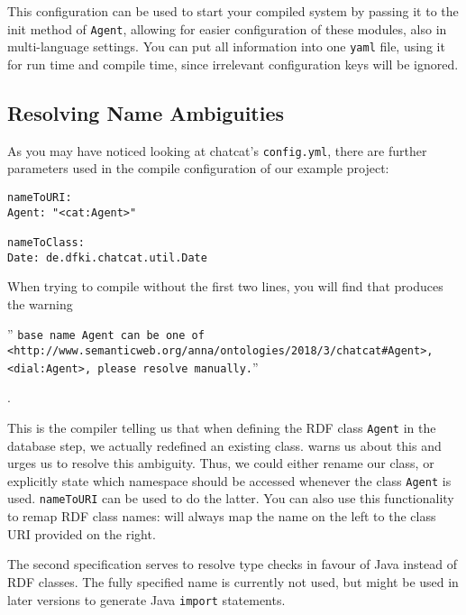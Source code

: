 This configuration can be used to start your compiled system by passing it to
the init method of \texttt{Agent}, allowing for easier configuration of these
modules, also in multi-language settings. You can put all information into one
\texttt{yaml} file, using it for run time and compile time, since irrelevant
configuration keys will be ignored.

\subsection{Resolving Name Ambiguities} \label{sec:nsAmbigue}

As you may have noticed looking at chatcat's \texttt{config.yml}, there are
further parameters used in the compile configuration of our example project:

\begin{verbatim}
nameToURI:
Agent: "<cat:Agent>"

nameToClass:
Date: de.dfki.chatcat.util.Date
\end{verbatim}

When trying to compile without the first two lines, you will find that \vonda
produces the warning \begin{small}'' \texttt{base name Agent can be one of
    <http://www.semanticweb.org/anna/ontologies/2018/3/chatcat\#Agent>,
    <dial:Agent>, please resolve manually.}''
\end{small}.

This is the compiler telling us that when defining the RDF class \texttt{Agent}
in the database step, we actually redefined an existing class. \vonda warns us
about this and urges us to resolve this ambiguity. Thus, we could either rename
our class, or explicitly state which namespace should be accessed whenever the
class \texttt{Agent} is used. \texttt{nameToURI} can be used to do the latter.
You can also use this functionality to remap RDF class names: \vonda will
always map the name on the left to the class URI provided on the right.

The second specification serves to resolve type checks in favour of Java
instead of RDF classes. The fully specified name is currently not used, but
might be used in later versions to generate Java \texttt{import} statements.


